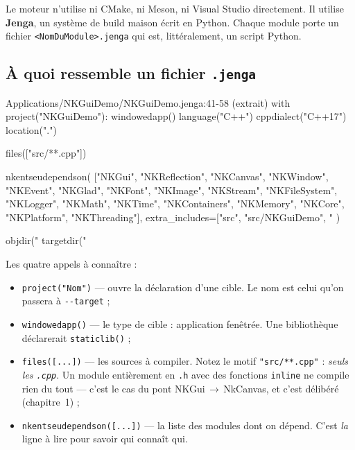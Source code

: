 Le moteur n'utilise ni CMake, ni Meson, ni Visual Studio directement. Il utilise
\textbf{Jenga}, un système de build maison écrit en Python. Chaque module porte
un fichier \texttt{<NomDuModule>.jenga} qui est, littéralement, un script Python.

\subsection{À quoi ressemble un fichier \texttt{.jenga}}

\begin{nkcode}{Applications/NKGuiDemo/NKGuiDemo.jenga:41-58 (extrait)}
with project("NKGuiDemo"):
    windowedapp()
    language("C++")
    cppdialect("C++17")
    location(".")

    files(["src/**.cpp"])

    nkentseudependson(
        ["NKGui", "NKReflection", "NKCanvas", "NKWindow", "NKEvent", "NKGlad",
         "NKFont", "NKImage", "NKStream", "NKFileSystem", "NKLogger", "NKMath",
         "NKTime", "NKContainers", "NKMemory", "NKCore", "NKPlatform", "NKThreading"],
        extra_includes=["src", "src/NKGuiDemo", "%
    )

    objdir("%
    targetdir("%
\end{nkcode}

Les quatre appels à connaître :

\begin{itemize}
  \item \texttt{project("Nom")} — ouvre la déclaration d'une cible. Le nom est
        celui qu'on passera à \texttt{-{}-target} ;
  \item \texttt{windowedapp()} — le type de cible : application fenêtrée. Une
        bibliothèque déclarerait \texttt{staticlib()} ;
  \item \texttt{files([...])} — les sources à compiler. Notez le motif
        \texttt{"src/**.cpp"} : \emph{seuls les \texttt{.cpp}}. Un module
        entièrement en \texttt{.h} avec des fonctions \texttt{inline} ne compile
        rien du tout — c'est le cas du pont NKGui\,$\rightarrow$\,NkCanvas, et
        c'est délibéré (chapitre~1) ;
  \item \texttt{nkentseudependson([...])} — la liste des modules dont on dépend.
        C'est \emph{la} ligne à lire pour savoir qui connaît qui.
\end{itemize}

